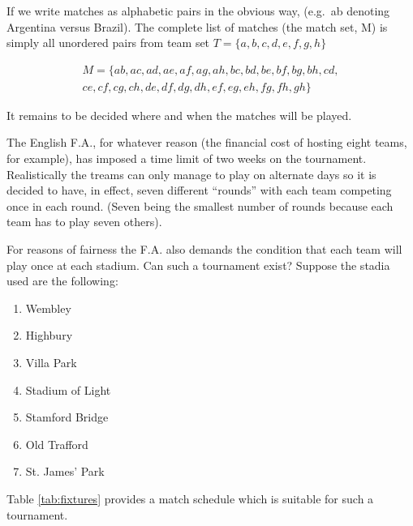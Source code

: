 \documentclass[
  11pt,
  a4paper]{book}
\begin{document}
If we write matches as alphabetic pairs in the obvious way, (e.g.~ab
denoting Argentina versus Brazil). The complete list of matches (the
match set, M) is simply all unordered pairs from team set
\(T = \{a, b, c, d, e, f, g, h\}\)

\begin{equation*}
  \begin{split}
    M = \{
      ab, ac, ad, ae, af, ag, ah, bc, bd, be, bf, bg, bh, cd, \\
      ce, cf, cg, ch, de, df, dg, dh, ef, eg, eh, fg, fh, gh
    \}
  \end{split}
\end{equation*}

It remains to be decided where and when the matches will be played.

The English F.A., for whatever reason (the financial cost of hosting
eight teams, for example), has imposed a time limit of two weeks on the
tournament. Realistically the treams can only manage to play on
alternate days so it is decided to have, in effect, seven different
``rounds'' with each team competing once in each round. (Seven being
the smallest number of rounds because each team has to play seven
others).

For reasons of fairness the F.A. also demands the condition that each
team will play once at each stadium.
Can such a tournament exist?
Suppose the stadia used are the following:

\begin{enumerate}
  \item{Wembley}
  \item{Highbury}
  \item{Villa Park}
  \item{Stadium of Light}
  \item{Stamford Bridge}
  \item{Old Trafford}
  \item{St. James' Park}
\end{enumerate}

Table
\ref{tab:fixtures}
provides a match schedule which is suitable for
such a tournament.
\end{document}
